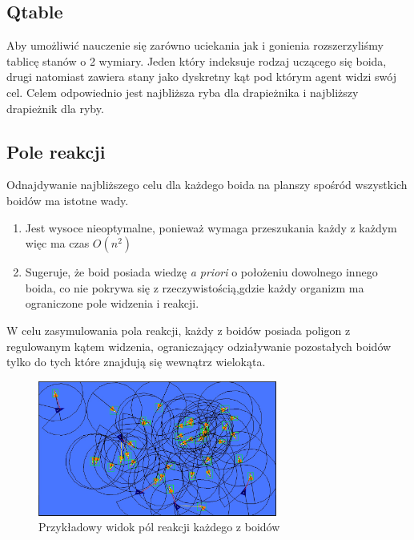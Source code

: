 \documentclass{article}
\begin{document}
\subsection{Qtable}
Aby umożliwić nauczenie się zarówno uciekania jak i gonienia rozszerzyliśmy tablicę stanów o 2 wymiary. Jeden który indeksuje rodzaj uczącego się boida, drugi natomiast zawiera stany jako dyskretny kąt pod którym agent widzi swój cel. Celem odpowiednio jest najbliższa ryba dla drapieżnika i najbliższy drapieżnik dla ryby.
\subsection{Pole reakcji}
Odnajdywanie najbliższego celu dla każdego boida na planszy spośród wszystkich boidów ma istotne wady.
\begin{enumerate}
    \item Jest wysoce nieoptymalne, ponieważ wymaga przeszukania każdy z każdym więc ma czas \(O(n^2)\)
    \item Sugeruje, że boid posiada wiedzę \textit{a priori} o położeniu dowolnego innego boida, co nie pokrywa się z rzeczywistością,gdzie każdy organizm ma ograniczone pole widzenia i reakcji.
\end{enumerate}
W celu zasymulowania pola reakcji, każdy z boidów posiada poligon z regulowanym kątem widzenia, ograniczający odziaływanie pozostałych boidów tylko do tych które znajdują się wewnątrz wielokąta.
\begin{figure}[h]
    \centering
    \includegraphics[width=0.7\textwidth]{12_hunting_debug.jpg}
    \caption{Przykładowy widok pól reakcji każdego z boidów}
\end{figure}
\end{document}
